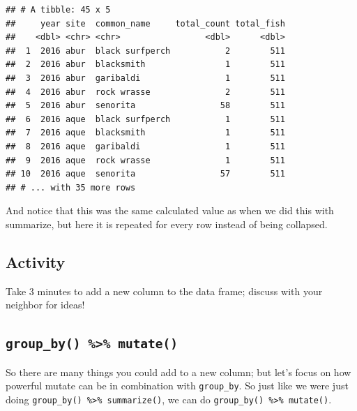 \documentclass[]{book}
\newenvironment{Shaded}{\begin{snugshade}}{\end{snugshade}}
\newcommand{\DataTypeTok}[1]{\textcolor[rgb]{0.13,0.29,0.53}{#1}}
\newcommand{\KeywordTok}[1]{\textcolor[rgb]{0.13,0.29,0.53}{\textbf{#1}}}
\newcommand{\NormalTok}[1]{#1}
\newcommand{\OperatorTok}[1]{\textcolor[rgb]{0.81,0.36,0.00}{\textbf{#1}}}
\newcommand{\StringTok}[1]{\textcolor[rgb]{0.31,0.60,0.02}{#1}}
\begin{document}
\begin{Shaded}
\end{Shaded}

\begin{verbatim}
## # A tibble: 45 x 5
##     year site  common_name     total_count total_fish
##    <dbl> <chr> <chr>                 <dbl>      <dbl>
##  1  2016 abur  black surfperch           2        511
##  2  2016 abur  blacksmith                1        511
##  3  2016 abur  garibaldi                 1        511
##  4  2016 abur  rock wrasse               2        511
##  5  2016 abur  senorita                 58        511
##  6  2016 aque  black surfperch           1        511
##  7  2016 aque  blacksmith                1        511
##  8  2016 aque  garibaldi                 1        511
##  9  2016 aque  rock wrasse               1        511
## 10  2016 aque  senorita                 57        511
## # ... with 35 more rows
\end{verbatim}

And notice that this was the same calculated value as when we did this with summarize, but here it is repeated for every row instead of being collapsed.

\hypertarget{activity-5}{%
\subsection{Activity}\label{activity-5}}

Take 3 minutes to add a new column to the data frame; discuss with your neighbor for ideas!

\hypertarget{group_by-mutate}{%
\subsection{\texorpdfstring{\texttt{group\_by()\ \%\textgreater{}\%\ mutate()}}{group\_by() \%\textgreater{}\% mutate()}}\label{group_by-mutate}}

So there are many things you could add to a new column; but let's focus on how powerful mutate can be in combination with \texttt{group\_by}. So just like we were just doing \texttt{group\_by()\ \%\textgreater{}\%\ summarize()}, we can do \texttt{group\_by()\ \%\textgreater{}\%\ mutate()}.
\end{document}
